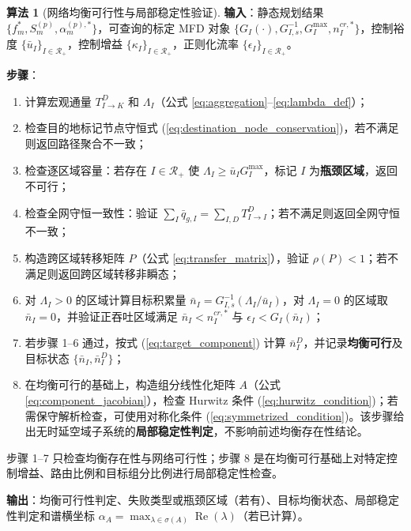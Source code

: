 \documentclass[a4paper,12pt]{article}
\theoremstyle{plain}
\theoremstyle{definition}
\newtheorem{algorithm}[theorem]{算法}
\theoremstyle{remark}
\begin{document}
\begin{algorithm}[网络均衡可行性与局部稳定性验证]\label{alg:network_feasibility_stability}
\textbf{输入}：静态规划结果 $\{f_m^*, S_m^{(p)}, \alpha_m^{(p),*}\}$，可查询的标定 MFD 对象 $\{G_I(\cdot),G_{I,s}^{-1},G_I^{\max}, n_I^{cr,*}\}$，控制裕度 $\{\bar u_I\}_{I\in\mathcal R_+}$，控制增益 $\{\kappa_I\}_{I\in\mathcal R_+}$，正则化流率 $\{\epsilon_I\}_{I\in\mathcal R_+}$。

\textbf{步骤}：
\begin{enumerate}
    \item 计算宏观通量 $T_{I \to K}^D$ 和 $\Lambda_I$（公式 \ref{eq:aggregation}--\ref{eq:lambda_def}）；
    \item 检查目的地标记节点守恒式 (\ref{eq:destination_node_conservation})，若不满足则返回路径聚合不一致；
    \item 检查逐区域容量：若存在 $I\in\mathcal R_+$ 使 $\Lambda_I \ge \bar u_I G_I^{\max}$，标记 $I$ 为\textbf{瓶颈区域}，返回不可行；
    \item 检查全网守恒一致性：验证 $\sum_I \bar{q}_{g,I} = \sum_{I,D} T_{I \to I}^D$；若不满足则返回全网守恒不一致；
    \item 构造跨区域转移矩阵 $P$（公式 \ref{eq:transfer_matrix}），验证 $\rho(P)<1$；若不满足则返回跨区域转移非瞬态；
    \item 对 $\Lambda_I>0$ 的区域计算目标积累量 $\bar{n}_I = G_{I,s}^{-1}(\Lambda_I/\bar u_I)$，对 $\Lambda_I=0$ 的区域取 $\bar n_I=0$，并验证正吞吐区域满足 $\bar{n}_I < n_I^{cr,*}$ 与 $\epsilon_I<G_I(\bar n_I)$；
    \item 若步骤 1--6 通过，按式 (\ref{eq:target_component}) 计算 $\bar n_I^D$，并记录\textbf{均衡可行}及目标状态 $\{\bar{n}_I, \bar{n}_I^D\}$；
    \item 在均衡可行的基础上，构造组分线性化矩阵 $A$（公式 \ref{eq:component_jacobian}），检查 Hurwitz 条件 (\ref{eq:hurwitz_condition})；若需保守解析检查，可使用对称化条件 (\ref{eq:symmetrized_condition})。该步骤给出无时延空域子系统的\textbf{局部稳定性判定}，不影响前述均衡存在性结论。
\end{enumerate}

步骤 1--7 只检查均衡存在性与网络可行性；步骤 8 是在均衡可行基础上对特定控制增益、路由比例和目标组分比例进行局部稳定性检查。

\textbf{输出}：均衡可行性判定、失败类型或瓶颈区域（若有）、目标均衡状态、局部稳定性判定和谱横坐标 $\alpha_A=\max_{\lambda\in\sigma(A)}\operatorname{Re}(\lambda)$（若已计算）。
\end{algorithm}
\end{document}

